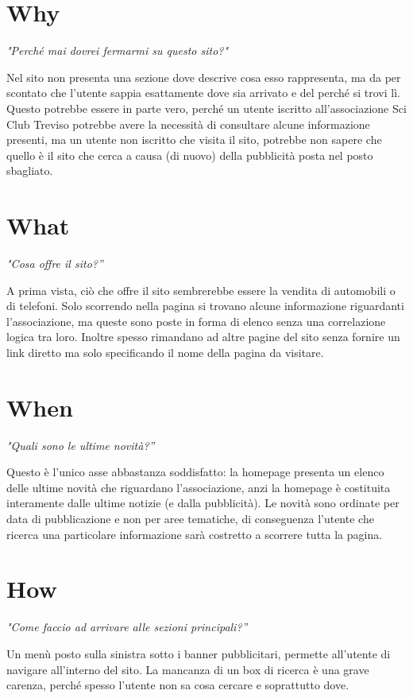     \section{Why}
    \begin{center}
        \textit{"Perché mai dovrei fermarmi su questo sito?"}
    \end{center}
    Nel sito non presenta una sezione dove descrive cosa esso rappresenta, ma da per scontato che l'utente sappia esattamente dove sia arrivato e del perché si trovi lì. Questo potrebbe essere in parte vero, perché un utente iscritto all'associazione Sci Club Treviso potrebbe avere la necessità di consultare alcune informazione presenti, ma un utente non iscritto che visita il sito, potrebbe non sapere che quello è il sito che cerca a causa (di nuovo) della pubblicità posta nel posto sbagliato.

    \section{What}
    \begin{center}
        \textit{"Cosa offre il sito?”}
    \end{center}
    A prima vista, ciò che offre il sito sembrerebbe essere la vendita di automobili o di telefoni. Solo scorrendo nella pagina  si trovano alcune informazione riguardanti l'associazione, ma queste sono poste in forma di  elenco senza una correlazione logica tra loro. Inoltre spesso rimandano ad altre pagine del sito senza fornire un link diretto ma solo specificando il nome della pagina da visitare.

    \section{When}
    \begin{center}
        \textit{"Quali sono le ultime novità?”}
    \end{center}
    Questo è l'unico asse abbastanza soddisfatto: la homepage presenta un elenco delle ultime novità che riguardano l'associazione, anzi la homepage è costituita interamente dalle ultime notizie (e dalla pubblicità). Le novità sono ordinate per data di pubblicazione e non per  aree tematiche, di conseguenza l'utente che ricerca una particolare informazione sarà costretto a scorrere tutta la pagina.

    \section{How}
    \begin{center}
        \textit{"Come faccio ad arrivare alle sezioni principali?”}
    \end{center}
    Un menù posto sulla sinistra sotto i banner pubblicitari, permette all'utente di navigare all'interno del sito. La mancanza di un box di ricerca è una grave carenza, perché spesso l'utente non sa cosa cercare e soprattutto dove.
    
